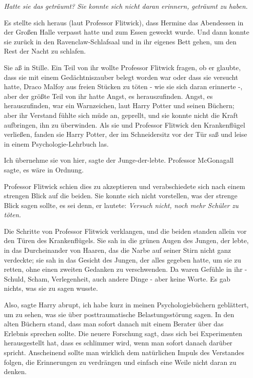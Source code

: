 \emph{Hatte sie das geträumt?} \emph{Sie konnte sich nicht daran erinnern,
geträumt zu haben. }

Es stellte sich heraus (laut Professor Flitwick), dass Hermine das Abendessen in
der Großen Halle verpasst hatte und zum Essen geweckt wurde. Und dann konnte sie
zurück in den Ravenclaw-Schlafsaal und in ihr eigenes Bett gehen, um den Rest
der Nacht zu schlafen.

Sie aß in Stille. Ein Teil von ihr wollte Professor Flitwick fragen, ob er
glaubte, dass sie mit einem Gedächtniszauber belegt worden war oder dass sie
versucht hatte, Draco Malfoy aus freien Stücken zu töten - wie sie sich daran
erinnerte -, aber der größte Teil von ihr hatte Angst, es herauszufinden. Angst,
es herauszufinden, war ein Warnzeichen, laut Harry Potter und seinen Büchern;
aber ihr Verstand fühlte sich müde an, geprellt, und sie konnte nicht die Kraft
aufbringen, ihn zu überwinden. Als sie und Professor Flitwick den Krankenflügel
verließen, fanden sie Harry Potter, der im Schneidersitz vor der Tür saß und
leise in einem Psychologie-Lehrbuch las.

\glqq Ich übernehme sie von hier\grqq{}, sagte der Junge-der-lebte. \glqq
Professor McGonagall sagte, es wäre in Ordnung.\grqq{}

Professor Flitwick schien dies zu akzeptieren und verabschiedete sich nach einem
strengen Blick auf die beiden. Sie konnte sich nicht vorstellen, was der strenge
Blick sagen sollte, es sei denn, er lautete: \emph{Versuch nicht, noch mehr
Schüler zu töten.}

Die Schritte von Professor Flitwick verklangen, und die beiden standen allein
vor den Türen des Krankenflügels. Sie sah in die grünen Augen des Jungen, der
lebte, in das Durcheinander von Haaren, das die Narbe auf seiner Stirn nicht
ganz verdeckte; sie sah in das Gesicht des Jungen, der alles gegeben hatte, um
sie zu retten, ohne einen zweiten Gedanken zu verschwenden. Da waren Gefühle in
ihr - Schuld, Scham, Verlegenheit, auch andere Dinge - aber keine Worte. Es gab
nichts, was sie zu sagen wusste.

\glqq Also\grqq{}, sagte Harry abrupt, \glqq ich habe kurz in meinen
Psychologiebüchern geblättert, um zu sehen, was sie über posttraumatische
Belastungsstörung sagen. In den alten Büchern stand, dass man sofort danach mit
einem Berater über das Erlebnis sprechen sollte. Die neuere Forschung sagt, dass
sich bei Experimenten herausgestellt hat, dass es schlimmer wird, wenn man
sofort danach darüber spricht. Anscheinend sollte man wirklich dem natürlichen
Impuls des Verstandes folgen, die Erinnerungen zu verdrängen und einfach eine
Weile nicht daran zu denken.\grqq{}

